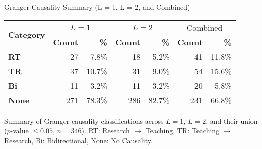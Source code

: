 \documentclass[aspectratio=169, table]{beamer}
\begin{document}
\begin{frame}[fragile]{\Large{Granger Causality Summary (L = 1, L = 2, and Combined)}}
	\vspace{20pt}
	\setlength{\arrayrulewidth}{0.3pt}
	\begin{center}
		\begin{tabular}{|l|r|r|r|r|r|r|}
			\hline
			\multirow{2}{*}{\textbf{Category}} 
			& \multicolumn{2}{c|}{$L=1$} 
			& \multicolumn{2}{c|}{$L=2$} 
			& \multicolumn{2}{c|}{Combined} \\ \cline{2-7}
			& \textbf{Count} & \textbf{\%}
			& \textbf{Count} & \textbf{\%}
			& \textbf{Count} & \textbf{\%} \\ \hline
			\textbf{RT}     & 27  & 7.8\%  & 18  & 5.2\%  & 41  & 11.8\% \\ \hline
			\textbf{TR}     & 37  & 10.7\% & 31  & 9.0\%  & 54  & 15.6\% \\ \hline
			\textbf{Bi}     & 11  & 3.2\%  & 11  & 3.2\%  & 20  & 5.8\%  \\ \hline
			\textbf{None}   & 271 & 78.3\% & 286 & 82.7\% & 231 & 66.8\% \\ \hline
		\end{tabular}
	\end{center}
	
	\vspace{10pt}
	Summary of Granger causality classifications across $L=1$, $L=2$, and their union ($p$-value $\leq 0.05$, $n=346$). RT: Research $\rightarrow$ Teaching, TR: Teaching $\rightarrow$ Research, Bi: Bidirectional, None: No Causality.
\end{frame}
\end{document}
